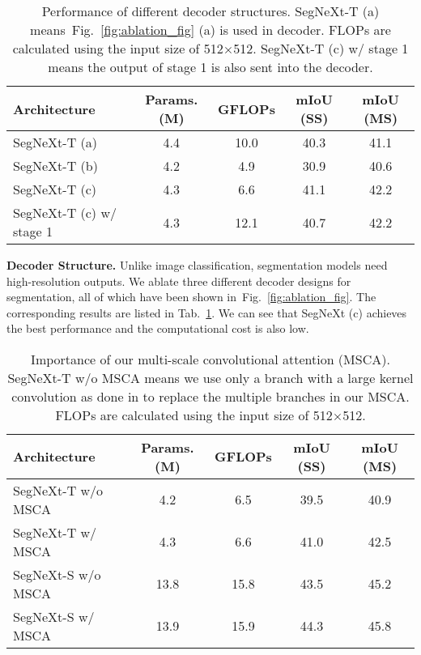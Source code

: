 \documentclass{article}
\newcommand{\figref}[1]{Fig.~\ref{#1}}
\newcommand{\tabref}[1]{Tab.~\ref{#1}}
\begin{document}
\begin{table}[ht]\centering
\renewcommand{\arraystretch}{1}
\renewcommand{\tabcolsep}{3mm}
\caption{Performance of different decoder structures. 
SegNeXt-T (a) means~\figref{fig:ablation_fig} (a) is used in decoder.
FLOPs are calculated using the input size of 512$\times$512.
SegNeXt-T (c) w/ stage 1 means the output of stage 1 is also sent into the decoder.
}
\begin{tabular}{l|cc|cc}
    \toprule
	Architecture & Params. (M) & GFLOPs & mIoU (SS) & mIoU (MS)  \\ \midrule
	SegNeXt-T (a)            & 4.4 & 10.0 & 40.3 & 41.1 \\ 
	SegNeXt-T (b)            & 4.2 & 4.9  & 30.9 & 40.6 \\ 
	SegNeXt-T (c)            & 4.3 & 6.6  & 41.1 & 42.2 \\ 
	SegNeXt-T (c) w/ stage 1 & 4.3 & 12.1 & 40.7 & 42.2 \\ 
    \bottomrule
\end{tabular}
\label{tab:ablation_architecture}
\end{table}


\textbf{Decoder Structure.} Unlike image classification, segmentation models need
high-resolution outputs. We ablate three different decoder designs for segmentation,
all of which have been shown in~\figref{fig:ablation_fig}.
The corresponding results are listed in \tabref{tab:ablation_architecture}.
We can see that SegNeXt (c) achieves the best performance and the computational cost
is also low.


\begin{table}[ht]\centering
\renewcommand{\arraystretch}{1}
\renewcommand{\tabcolsep}{3mm}
\caption{Importance of our multi-scale convolutional attention (MSCA). 
SegNeXt-T w/o MSCA means we use only a branch with a large kernel convolution
as done in \cite{guo2022visual} to replace the multiple branches in our MSCA.
FLOPs are calculated using the input size of 512$\times$512.
}
\begin{tabular}{l|cc|cc}
    \toprule
	Architecture & Params. (M) & GFLOPs & mIoU (SS) & mIoU (MS)  \\ \midrule
	SegNeXt-T w/o MSCA & 4.2 & 6.5 & 39.5 & 40.9 \\ 
	SegNeXt-T w/ MSCA & 4.3 & 6.6 & 41.0 & 42.5 \\  \midrule
	SegNeXt-S w/o MSCA & 13.8 & 15.8 & 43.5 & 45.2 \\ 
	SegNeXt-S w/ MSCA & 13.9 & 15.9 & 44.3 & 45.8 \\ 
    \bottomrule
\end{tabular}
\label{tab:multi_scale}
\vspace{-0.3cm}
\end{table}
\end{document}
